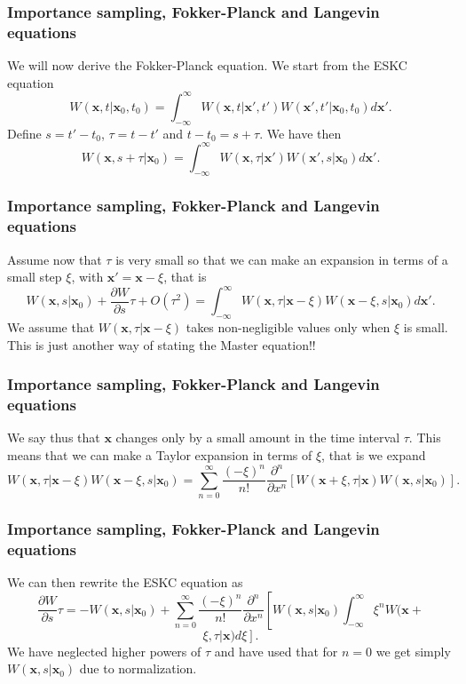 \documentclass{beamer}
\begin{document}
\begin{frame}
\frametitle{Importance sampling, Fokker-Planck and Langevin equations}

We will now derive the Fokker-Planck equation. 
We start from the ESKC equation
\[
 W(\mathbf{x},t|\mathbf{x}_0,t_0)  = \int_{-\infty}^{\infty} W(\mathbf{x},t|\mathbf{x}',t')W(\mathbf{x}',t'|\mathbf{x}_0,t_0)d\mathbf{x}'.
\]
Define $s=t'-t_0$, $\tau=t-t'$ and $t-t_0=s+\tau$. We have then
\[
 W(\mathbf{x},s+\tau|\mathbf{x}_0)  = \int_{-\infty}^{\infty} W(\mathbf{x},\tau|\mathbf{x}')W(\mathbf{x}',s|\mathbf{x}_0)d\mathbf{x}'.
\]
\end{frame}

\begin{frame}
\frametitle{Importance sampling, Fokker-Planck and Langevin equations}

Assume now that $\tau$ is very small so that we can make an expansion in terms of a small step $\xi$, with $\mathbf{x}'=\mathbf{x}-\xi$, that is
\[
 W(\mathbf{x},s|\mathbf{x}_0)+\frac{\partial W}{\partial s}\tau +O(\tau^2) = \int_{-\infty}^{\infty} W(\mathbf{x},\tau|\mathbf{x}-\xi)W(\mathbf{x}-\xi,s|\mathbf{x}_0)d\mathbf{x}'.
\]
We assume that $W(\mathbf{x},\tau|\mathbf{x}-\xi)$ takes non-negligible values only when $\xi$ is small. This is just another way of stating the Master equation!!
\end{frame}

\begin{frame}
\frametitle{Importance sampling, Fokker-Planck and Langevin equations}

We say thus that $\mathbf{x}$ changes only by a small amount in the time interval $\tau$. 
This means that we can make a Taylor expansion in terms of $\xi$, that is we
expand
\[
W(\mathbf{x},\tau|\mathbf{x}-\xi)W(\mathbf{x}-\xi,s|\mathbf{x}_0) =
\sum_{n=0}^{\infty}\frac{(-\xi)^n}{n!}\frac{\partial^n}{\partial x^n}\left[W(\mathbf{x}+\xi,\tau|\mathbf{x})W(\mathbf{x},s|\mathbf{x}_0)
\right].
\]
\end{frame}

\begin{frame}
\frametitle{Importance sampling, Fokker-Planck and Langevin equations}

We can then rewrite the ESKC equation as 
\[
\frac{\partial W}{\partial s}\tau=-W(\mathbf{x},s|\mathbf{x}_0)+
\sum_{n=0}^{\infty}\frac{(-\xi)^n}{n!}\frac{\partial^n}{\partial x^n}
\left[W(\mathbf{x},s|\mathbf{x}_0)\int_{-\infty}^{\infty} \xi^nW(\mathbf{x}+\right.
\]
\[
\left. \xi,\tau|\mathbf{x})d\xi\right].
\]
We have neglected higher powers of $\tau$ and have used that for $n=0$ 
we get simply $W(\mathbf{x},s|\mathbf{x}_0)$ due to normalization.
\end{frame}
\end{document}
